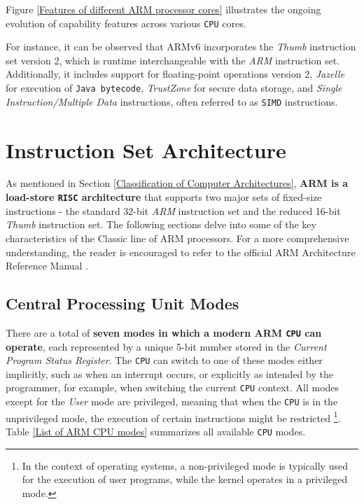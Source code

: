 \documentclass[english, ing, kiv, he, iso690numb, pdf]{fasthesis}
\begin{document}
	Figure \ref{Features of different ARM processor cores} illustrates the ongoing evolution of capability features across various \texttt{CPU} cores.
	
	\newpage
	
	For instance, it can be observed that ARMv6 incorporates the \textit{Thumb} instruction set version 2, which is runtime interchangeable with the \textit{ARM} instruction set. Additionally, it includes support for floating-point operations version 2, \textit{Jazelle} for execution of \texttt{Java bytecode}, \textit{TrustZone} for secure data storage, and \textit{Single Instruction/Multiple Data} instructions, often referred to as \texttt{SIMD} instructions.
	
	\section{Instruction Set Architecture}
	
	As mentioned in Section \ref{Classification of Computer Architectures}, \textbf{ARM is a load-store \texttt{RISC} architecture} that supports two major sets of fixed-size instructions - the standard 32-bit \textit{ARM} instruction set and the reduced 16-bit \textit{Thumb} instruction set. The following sections delve into some of the key characteristics of the Classic line of ARM processors. For a more comprehensive understanding, the reader is encouraged to refer to the official ARM Architecture Reference Manual \cite{ARM_reference_manual}.
	
	\subsection{Central Processing Unit Modes}
	
	There are a total of \textbf{seven modes in which a modern ARM \texttt{CPU} can operate}, each represented by a unique 5-bit number stored in the \textit{Current Program Status Register}. The \texttt{CPU} can switch to one of these modes either implicitly, such as when an interrupt occurs, or explicitly as intended by the programmer, for example, when switching the current \texttt{CPU} context. All modes except for the \textit{User} mode are privileged, meaning that when the \texttt{CPU} is in the unprivileged mode, the execution of certain instructions might be restricted \footnote{In the context of operating systems, a non-privileged mode is typically used for the execution of user programs, while the kernel operates in a privileged mode.}. Table \ref{List of ARM CPU modes} summarizes all available \texttt{CPU} modes.
	
\end{document}
